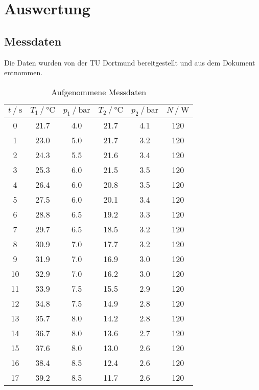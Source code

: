 \section{Auswertung}
\label{sec:Auswertung}
\subsection{Messdaten}
Die Daten wurden von der TU Dortmund bereitgestellt und aus dem Dokument \cite{DatenundHinweise} entnommen.
\begin{table}
  \centering
  \label{Aufgenommene Messdaten}
  \caption{Aufgenommene Messdaten}
  \begin{tabular}{S[table-format = 2.0] S[table-format = 2.1] S[table-format = 2.2] S[table-format = 2.1]
     S[table-format = 1.1] S[table-format = 3.0]}
     \toprule
     {$t \mathbin{/} \si{\second}$} & {$T_1 \mathbin{/} \si{\celsius}$} & {$p_1 \mathbin{/} \si{\bar}$} & {$T_2 \mathbin{/} \si{\celsius}$}
     & {$p_2 \mathbin{/} \si{\bar}$} & {$N \mathbin{/} \si{\watt}$} \\
     	& 21.7 &	4.0    &	21.7 & 4.1 & 120 \\
     1  & 23.0 &	5.0    &	21.7 & 3.2 & 120 \\
     2 	& 24.3 &	5.5    &	21.6 & 3.4 & 120 \\
     3 	& 25.3 &	6.0    &	21.5 & 3.5 & 120 \\
     4 	& 26.4 &	6.0    &	20.8 & 3.5 & 120 \\
     5 	& 27.5 &	6.0    &	20.1 & 3.4 & 120 \\
     6 	& 28.8 &	6.5    &	19.2 & 3.3 & 120 \\
     7 	& 29.7 &	6.5    &	18.5 & 3.2 & 120 \\
     8 	& 30.9 &	7.0    &	17.7 & 3.2 & 120 \\
     9 	& 31.9 &	7.0    &	16.9 & 3.0 & 120 \\
    10	& 32.9 &	7.0    &	16.2 & 3.0 & 120 \\
    11	& 33.9 &	7.5    &	15.5 & 2.9 & 120 \\
    12	& 34.8 &	7.5    &	14.9 & 2.8 & 120 \\
    13	& 35.7 &	8.0    &	14.2 & 2.8 & 120 \\
    14	& 36.7 &	8.0    &	13.6 & 2.7 & 120 \\
    15	& 37.6 &	8.0    &	13.0 & 2.6 & 120 \\
    16	& 38.4 &	8.5    &	12.4 & 2.6 & 120 \\
    17	& 39.2 &	8.5    &	11.7 & 2.6 & 120 \\

\end{tabular}
\end{table}
